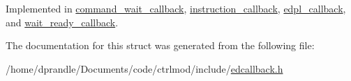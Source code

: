 Implemented in \hyperlink{structcommand__wait__callback_ae5ab034230cd73f6203cee386ba1993c}{command\-\_\-wait\-\_\-callback}, \hyperlink{structinstruction__callback_a74abfad8ac25461bb99e11fba10516c2}{instruction\-\_\-callback}, \hyperlink{structedpl__callback_a23c8aacf97d5a080af1f7d84439122c8}{edpl\-\_\-callback}, and \hyperlink{structwait__ready__callback_a305d57ffdd8bc5d3682dfa4a83431708}{wait\-\_\-ready\-\_\-callback}.



The documentation for this struct was generated from the following file\-:\begin{DoxyCompactItemize}
\item 
/home/dprandle/\-Documents/code/ctrlmod/include/\hyperlink{edcallback_8h}{edcallback.\-h}\end{DoxyCompactItemize}
